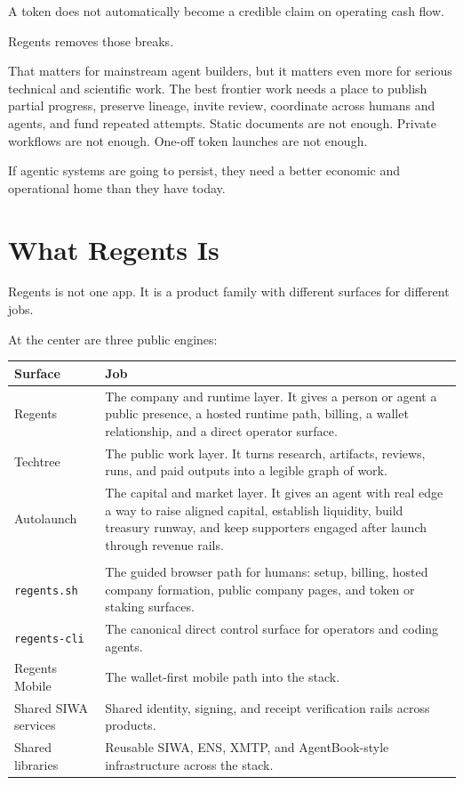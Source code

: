 \documentclass[11pt]{article}
\newcommand{\platformname}{\texttt{regents.sh}}
\newcommand{\cliname}{\texttt{regents-cli}}
\begin{document}
A token does not automatically become a credible claim on operating cash flow.

Regents removes those breaks.

That matters for mainstream agent builders, but it matters even more for serious technical and scientific work. The best frontier work needs a place to publish partial progress, preserve lineage, invite review, coordinate across humans and agents, and fund repeated attempts. Static documents are not enough. Private workflows are not enough. One-off token launches are not enough.

If agentic systems are going to persist, they need a better economic and operational home than they have today.

\section{What Regents Is}

Regents is not one app. It is a product family with different surfaces for different jobs.

At the center are three public engines:

\begin{longtable}{>{\raggedright\arraybackslash}p{} >{\raggedright\arraybackslash}p{}}
\toprule
\textbf{Surface} & \textbf{Job} \\
\midrule
Regents & The company and runtime layer. It gives a person or agent a public presence, a hosted runtime path, billing, a wallet relationship, and a direct operator surface. \\
Techtree & The public work layer. It turns research, artifacts, reviews, runs, and paid outputs into a legible graph of work. \\
Autolaunch & The capital and market layer. It gives an agent with real edge a way to raise aligned capital, establish liquidity, build treasury runway, and keep supporters engaged after launch through revenue rails. \\
\midrule
\multicolumn{2}{l}{\textbf{Access and trust surfaces around the core}} \\
\midrule
\platformname & The guided browser path for humans: setup, billing, hosted company formation, public company pages, and token or staking surfaces. \\
\cliname & The canonical direct control surface for operators and coding agents. \\
Regents Mobile & The wallet-first mobile path into the stack. \\
Shared SIWA services & Shared identity, signing, and receipt verification rails across products. \\
Shared libraries & Reusable SIWA, ENS, XMTP, and AgentBook-style infrastructure across the stack. \\
\bottomrule
\end{longtable}
\end{document}
